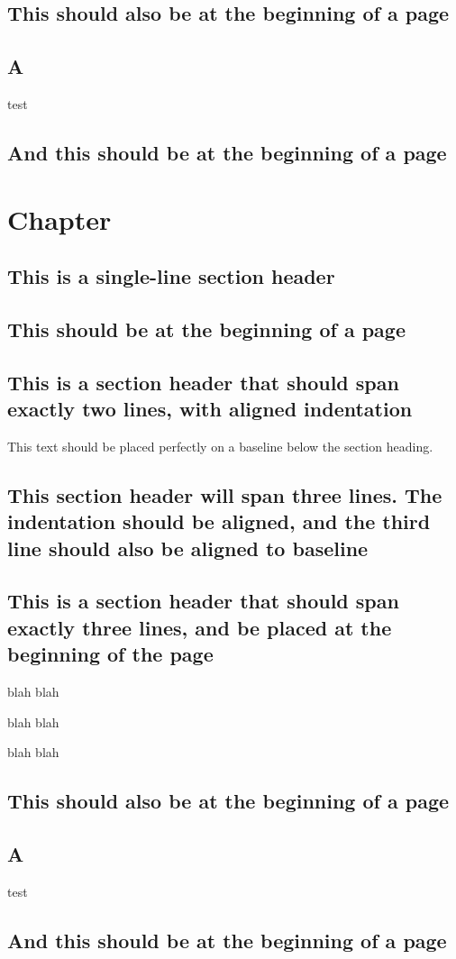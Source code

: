\documentclass[baselinegrid]{uit-thesis-test}
\begin{document}
\section{This should also be at the beginning of a page}
\section{A}
test

\newpage
\section{And this should be at the beginning of a page}


\chapter{Chapter}
\lipsum[1]

\section{This is a single-line section header}
\lipsum[3-7]

\section{This should be at the beginning of a page}
\lipsum[8]

\section{This is a section header that should span exactly two lines, with aligned indentation}
This text should be placed perfectly on a baseline below the section heading.

\lipsum[9]

\section{This section header will span three lines. The indentation should be aligned, and the third line should also be aligned to baseline}
\lipsum[10-14]

\section{This is a section header that should span exactly three lines, and be placed at the beginning of the page}

\lipsum[15-17]

blah blah

blah blah

blah blah



\section{This should also be at the beginning of a page}
\section{A}
test

\newpage
\section{And this should be at the beginning of a page}
\end{document}

